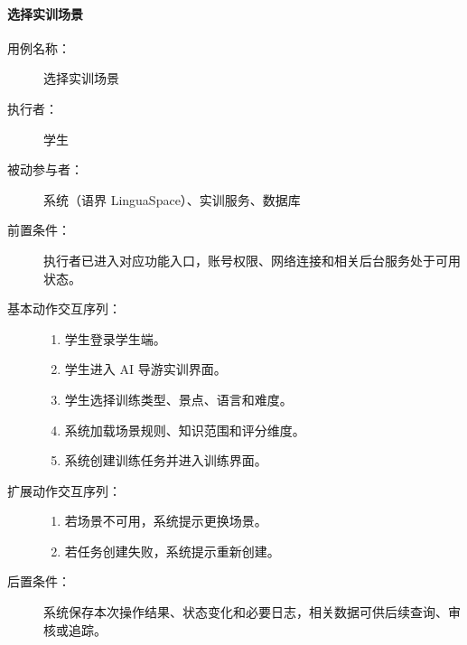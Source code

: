 \paragraph{选择实训场景}
\begin{description}
  \item[用例名称：] 选择实训场景
  \item[执行者：] 学生
  \item[被动参与者：] 系统（语界 LinguaSpace）、实训服务、数据库
  \item[前置条件：] 执行者已进入对应功能入口，账号权限、网络连接和相关后台服务处于可用状态。
  \item[基本动作交互序列：]
  \begin{enumerate}
    \item 学生登录学生端。
    \item 学生进入 AI 导游实训界面。
    \item 学生选择训练类型、景点、语言和难度。
    \item 系统加载场景规则、知识范围和评分维度。
    \item 系统创建训练任务并进入训练界面。
  \end{enumerate}
  \item[扩展动作交互序列：]
  \begin{enumerate}
    \item[3a.] 若场景不可用，系统提示更换场景。
    \item[5a.] 若任务创建失败，系统提示重新创建。
  \end{enumerate}
  \item[后置条件：] 系统保存本次操作结果、状态变化和必要日志，相关数据可供后续查询、审核或追踪。
\end{description}

